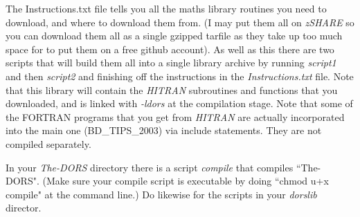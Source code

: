\documentclass[12pt]{article}
\begin{document}
The Instructions.txt file tells you all the maths library routines you need to download, and where to download them from. 
(I may put them all on {\it zSHARE} so you can download them all as a single gzipped tarfile as they take up
too much space for to put them on a free github account).
As well as this
there are two scripts that will build them all into a single library archive by running {\it script1} and then {\it script2}
and finishing off the instructions in the {\it Instructions.txt} file.
Note that this library will contain the {\it HITRAN} subroutines and functions that you downloaded, and is linked
 with {\it -ldors} at the compilation stage. Note that some of the FORTRAN programs that you get from {\it HITRAN}
are actually incorporated into the main one (BD\_TIPS\_2003) via include statements. They are not compiled separately.

 In your {\it The-DORS} directory there 
is a script {\it compile} that compiles ``The-DORS". (Make sure your compile script is executable by doing ``chmod u+x compile"
at the command line.) Do likewise for the scripts in your {\it dorslib} director.







\end{document}
